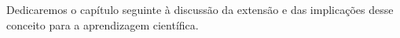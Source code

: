 Dedicaremos o capítulo seguinte à discussão da extensão e das implicações desse conceito para a aprendizagem científica.



































	
